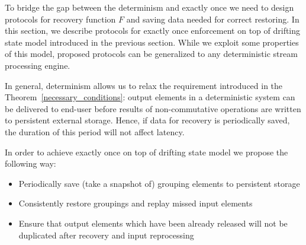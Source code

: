 
\label {fs-consistency-section}

To bridge the gap between the determinism and exactly once we need to design protocols for recovery function $F$ and saving data needed for correct restoring. In this section, we describe protocols for exactly once enforcement on top of drifting state model introduced in the previous section. While we exploit some properties of this model, proposed protocols can be generalized to any deterministic stream processing engine.

In general, determinism allows us to relax the requirement introduced in the Theorem~\ref{necessary_conditions}: output elements in a deterministic system can be delivered to end-user before results of non-commutative operations are written to persistent external storage. Hence, if data for recovery is periodically saved, the duration of this period will not affect latency.

In order to achieve exactly once on top of drifting state model we propose the following way:
\begin{itemize}
    \item Periodically save (take a snapshot of) grouping elements to persistent storage
    \item Consistently restore groupings and replay missed input elements
    \item Ensure that output elements which have been already released will not be duplicated after recovery and input reprocessing
\end{itemize}

